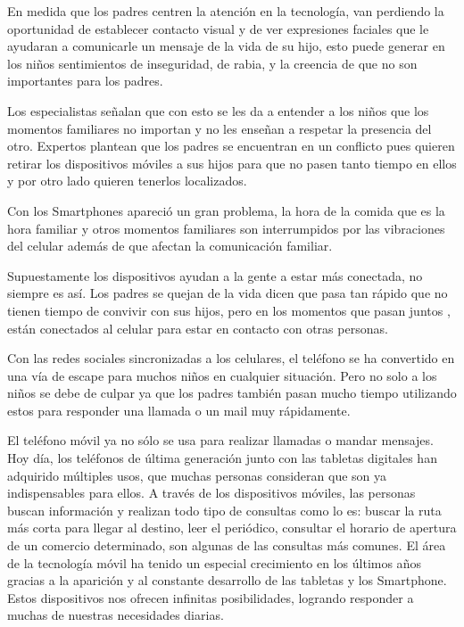 \documentclass[10pt,a4paper]{article}
\begin{document}
En medida que los padres centren la atenci{\'o}n en la tecnolog{\'i}a, van perdiendo la oportunidad de establecer contacto visual y de ver expresiones faciales que le ayudaran a comunicarle un mensaje de la vida de su hijo, esto puede generar en los ni{\~n}os sentimientos de inseguridad, de rabia, y la creencia de que no son importantes para los padres.

Los especialistas  se{\~n}alan que con esto se les da a entender a los ni{\~n}os que los momentos familiares no importan y no les ense{\~n}an a respetar la presencia del otro. Expertos plantean que los padres se encuentran en un conflicto pues quieren retirar los dispositivos m{\'o}viles a sus hijos para que no pasen tanto tiempo en ellos y por otro lado quieren tenerlos localizados. 

Con los Smartphones apareci{\'o} un gran problema, la hora de la comida que es la hora familiar y otros momentos familiares son interrumpidos por las vibraciones del celular adem{\'a}s de que afectan la comunicaci{\'o}n familiar. 

Supuestamente los dispositivos ayudan a la gente a estar m{\'a}s conectada, no siempre es as{\'i}. Los padres se quejan de la vida dicen que pasa tan r{\'a}pido que no tienen tiempo de convivir con sus hijos, pero en los momentos que pasan juntos , est{\'a}n conectados al celular para estar en contacto con otras personas.

Con las redes sociales sincronizadas a los celulares, el tel{\'e}fono se ha convertido en una v{\'i}a de escape para muchos ni{\~n}os en cualquier situaci{\'o}n. Pero no solo a los ni{\~n}os se debe de culpar ya que los padres tambi{\'e}n pasan mucho tiempo utilizando estos para responder una llamada o un mail muy r{\'a}pidamente.

El tel{\'e}fono m{\'o}vil ya no s{\'o}lo se usa para realizar llamadas o mandar mensajes. Hoy d{\'i}a, los tel{\'e}fonos de {\'u}ltima generaci{\'o}n junto con las tabletas digitales han adquirido m{\'u}ltiples usos, que muchas personas consideran que son ya indispensables para ellos. A trav{\'e}s de los dispositivos m{\'o}viles, las personas buscan informaci{\'o}n y realizan todo tipo de consultas como lo es: buscar la ruta m{\'a}s corta para llegar al destino, leer el peri{\'o}dico, consultar el horario de apertura de un comercio determinado, son algunas de las consultas m{\'a}s comunes. El {\'a}rea de la tecnolog{\'i}a m{\'o}vil ha tenido un especial crecimiento en los {\'u}ltimos a{\~n}os gracias a la aparici{\'o}n y al constante desarrollo de las tabletas y los Smartphone. Estos dispositivos nos ofrecen infinitas posibilidades, logrando responder a muchas de nuestras necesidades diarias.
\end{document}
